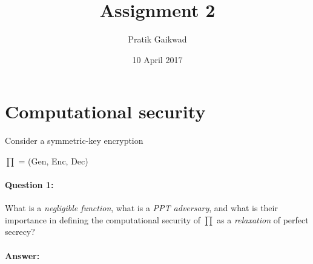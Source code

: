 \documentclass{article}
\title{Assignment 2}
\author{Pratik Gaikwad}
\date{10 April 2017}
\begin{document}
\maketitle

\section{Computational security}
    
    Consider a symmetric-key encryption
    \begin{center}
        $ \prod $ = (Gen, Enc, Dec)
    \end{center}
    
    \paragraph{Question 1:} What is a \emph{negligible function}, what is a \emph{PPT adversary}, and what is their importance in defining the computational security of 
    \begin{math} 
        \prod 
    \end{math} as a \emph{relaxation} of perfect secrecy?
    
    \paragraph{Answer:\newline} 
    
\end{document}
